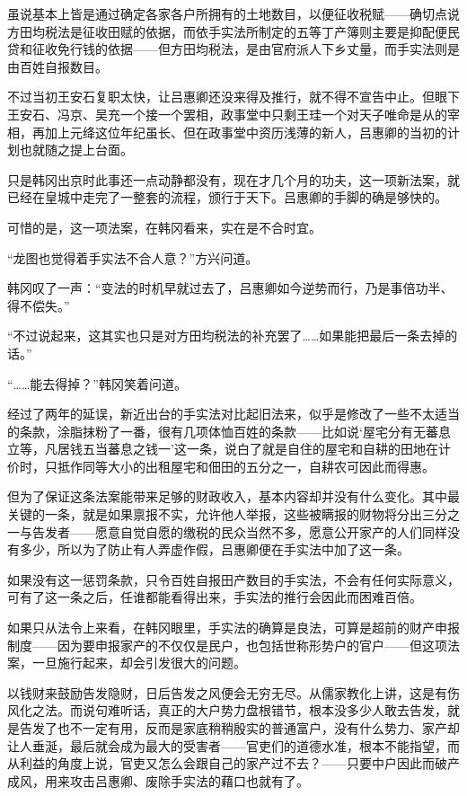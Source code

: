 虽说基本上皆是通过确定各家各户所拥有的土地数目，以便征收税赋——确切点说方田均税法是征收田赋的依据，而依手实法所制定的五等丁产簿则主要是抑配便民贷和征收免行钱的依据——但方田均税法，是由官府派人下乡丈量，而手实法则是由百姓自报数目。

不过当初王安石复职太快，让吕惠卿还没来得及推行，就不得不宣告中止。但眼下王安石、冯京、吴充一个接一个罢相，政事堂中只剩王珪一个对天子唯命是从的宰相，再加上元绛这位年纪虽长、但在政事堂中资历浅薄的新人，吕惠卿的当初的计划也就随之提上台面。

只是韩冈出京时此事还一点动静都没有，现在才几个月的功夫，这一项新法案，就已经在皇城中走完了一整套的流程，颁行于天下。吕惠卿的手脚的确是够快的。

可惜的是，这一项法案，在韩冈看来，实在是不合时宜。

“龙图也觉得着手实法不合人意？”方兴问道。

韩冈叹了一声：“变法的时机早就过去了，吕惠卿如今逆势而行，乃是事倍功半、得不偿失。”

“不过说起来，这其实也只是对方田均税法的补充罢了……如果能把最后一条去掉的话。”

“……能去得掉？”韩冈笑着问道。

经过了两年的延误，新近出台的手实法对比起旧法来，似乎是修改了一些不太适当的条款，涂脂抹粉了一番，很有几项体恤百姓的条款——比如说‘屋宅分有无蕃息立等，凡居钱五当蕃息之钱一’这一条，说白了就是自住的屋宅和自耕的田地在计价时，只抵作同等大小的出租屋宅和佃田的五分之一，自耕农可因此而得惠。

但为了保证这条法案能带来足够的财政收入，基本内容却并没有什么变化。其中最关键的一条，就是如果禀报不实，允许他人举报，这些被瞒报的财物将分出三分之一与告发者——愿意自觉自愿的缴税的民众当然不多，愿意公开家产的人们同样没有多少，所以为了防止有人弄虚作假，吕惠卿便在手实法中加了这一条。

如果没有这一惩罚条款，只令百姓自报田产数目的手实法，不会有任何实际意义，可有了这一条之后，任谁都能看得出来，手实法的推行会因此而困难百倍。

如果只从法令上来看，在韩冈眼里，手实法的确算是良法，可算是超前的财产申报制度——因为要申报家产的不仅仅是民户，也包括世称形势户的官户——但这项法案，一旦施行起来，却会引发很大的问题。

以钱财来鼓励告发隐财，日后告发之风便会无穷无尽。从儒家教化上讲，这是有伤风化之法。而说句难听话，真正的大户势力盘根错节，根本没多少人敢去告发，就是告发了也不一定有用，反而是家底稍稍殷实的普通富户，没有什么势力、家产却让人垂涎，最后就会成为最大的受害者——官吏们的道德水准，根本不能指望，而从利益的角度上说，官吏又怎么会跟自己的家产过不去？——只要中户因此而破产成风，用来攻击吕惠卿、废除手实法的藉口也就有了。

